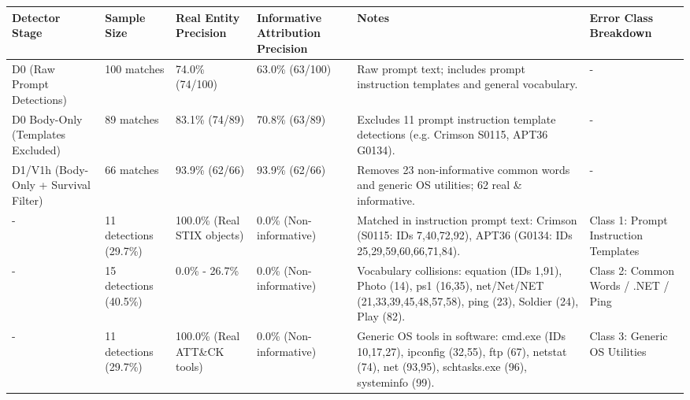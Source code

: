 \begin{tabular}{llllll}
\toprule
Detector Stage & Sample Size & Real Entity Precision & Informative Attribution Precision & Notes & Error Class Breakdown \\
\midrule
D0 (Raw Prompt Detections) & 100 matches & 74.0\% (74/100) & 63.0\% (63/100) & Raw prompt text; includes prompt instruction templates and general vocabulary. & - \\
D0 Body-Only (Templates Excluded) & 89 matches & 83.1\% (74/89) & 70.8\% (63/89) & Excludes 11 prompt instruction template detections (e.g. Crimson S0115, APT36 G0134). & - \\
D1/V1h (Body-Only + Survival Filter) & 66 matches & 93.9\% (62/66) & 93.9\% (62/66) & Removes 23 non-informative common words and generic OS utilities; 62 real \& informative. & - \\
- & 11 detections (29.7\%) & 100.0\% (Real STIX objects) & 0.0\% (Non-informative) & Matched in instruction prompt text: Crimson (S0115: IDs 7,40,72,92), APT36 (G0134: IDs 25,29,59,60,66,71,84). & Class 1: Prompt Instruction Templates \\
- & 15 detections (40.5\%) & 0.0\% - 26.7\% & 0.0\% (Non-informative) & Vocabulary collisions: equation (IDs 1,91), Photo (14), ps1 (16,35), net/Net/NET (21,33,39,45,48,57,58), ping (23), Soldier (24), Play (82). & Class 2: Common Words / .NET / Ping \\
- & 11 detections (29.7\%) & 100.0\% (Real ATT\&CK tools) & 0.0\% (Non-informative) & Generic OS tools in software: cmd.exe (IDs 10,17,27), ipconfig (32,55), ftp (67), netstat (74), net (93,95), schtasks.exe (96), systeminfo (99). & Class 3: Generic OS Utilities \\
\bottomrule
\end{tabular}
